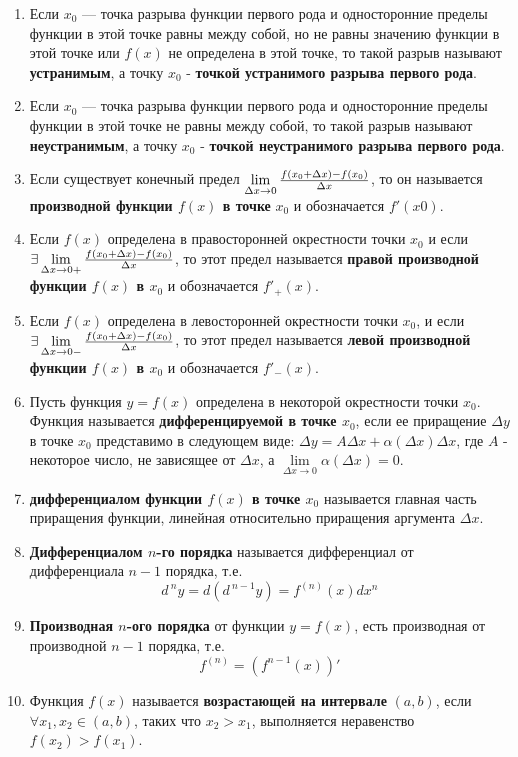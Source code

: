 \begin{enumerate}
\item Если $x_0$ — точка разрыва функции первого рода и односторонние пределы функции в этой точке равны между собой, но не равны значению функции в этой точке или $f(x)$ не определена в этой точке, то такой разрыв называют \textbf{устранимым}, а точку $x_0$ - \textbf{точкой устранимого разрыва первого рода}.
\item Если $x_0$ — точка разрыва функции первого рода и односторонние пределы функции в этой точке не равны между собой, то такой разрыв называют \textbf{неустранимым}, а точку $x_0$ - \textbf{точкой неустранимого разрыва первого рода}.
\item Если существует конечный предел $\lim\limits_{\Delta x \to 0} {\large\frac{f(x_0 + \Delta x) - f(x_0)}{\Delta x}}$, то он называется \textbf{производной функции $f(x)$ в точке} $x_0$ и обозначается $f'(x0)$.
\item Если $f(x)$ определена в правосторонней окрестности точки $x_0$ и если $\exists \lim\limits_{\Delta x \to 0+}{\large\frac{f(x_0+\Delta x) - f(x_0)}{\Delta x}}$, то этот предел называется \textbf{правой производной функции $f(x)$ в $x_0$} и обозначается $f'_+(x)$.
\item Если $f(x)$ определена в левосторонней окрестности точки $x_0$, и если $\exists \lim\limits_{\Delta x \to 0-}{\large\frac{f(x_0+\Delta x) - f(x_0)}{\Delta x}}$, то этот предел называется \textbf{левой производной функции $f(x)$ в $x_0$} и обозначается $f'_-(x)$.
\item Пусть функция $y = f(x)$ определена в некоторой окрестности точки $x_0$. Функция называется \textbf{дифференцируемой в точке $x_0$}, если ее приращение $\Delta y$ в точке $x_0$ представимо в следующем виде: $\Delta y = A\Delta x + \alpha(\Delta x)\Delta x$, где $A$ - некоторое число, не зависящее от $\Delta x$, а $\lim\limits_{\Delta x \to 0}\alpha(\Delta x) = 0$.
\item \textbf{дифференциалом функции $f(x)$ в точке $x_0$} называется главная часть приращения функции, линейная относительно приращения аргумента $\Delta x$.
\item \textbf{Дифференциалом $n$-го порядка} называется дифференциал от дифференциала $n-1$ порядка, т.е. $$d^{\ n}y = d(d^{\ n-1}y) = f^{(n)}(x)dx^n$$
\item \textbf{Производная $n$-ого порядка} от функции $y = f(x)$, есть производная от производной $n-1$ порядка, т.е. $$f^{(n)} = (f^{n-1}(x))'$$
\item Функция $f(x)$ называется \textbf{возрастающей на интервале} $(a, b)$, если $\forall x_1, x_2 \in (a, b)$, таких что $x_2 > x_1$, выполняется неравенство $f(x_2)>f(x_1)$.

\end{enumerate}
